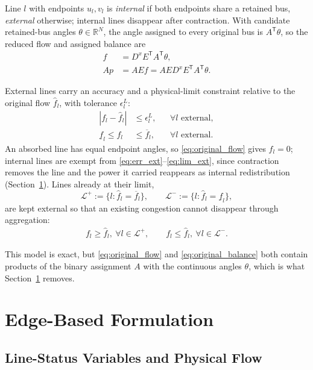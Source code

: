 \documentclass[journal]{IEEEtran}
\newcommand{\R}{\mathbb{R}}
\begin{document}
Line $l$ with endpoints $u_l,v_l$ is \emph{internal} if both endpoints share a retained bus, \emph{external} otherwise; internal lines disappear after contraction. With candidate retained-bus angles $\theta\in\R^N$, the angle assigned to every original bus is $A^{\mathsf T}\theta$, so the reduced flow and assigned balance are
\begin{align}
 f&=D^xE^{\mathsf T}A^{\mathsf T}\theta,
 \label{eq:original_flow}\\
 Ap&=AEf=AED^xE^{\mathsf T}A^{\mathsf T}\theta.
 \label{eq:original_balance}
\end{align}

External lines carry an accuracy and a physical-limit constraint relative to the original flow $\hat f_l$, with tolerance $\epsilon_l^L$:
\begin{align}
 |f_l-\hat f_l|&\le\epsilon_l^L,
 &&\forall l\text{ external},
 \label{eq:err_ext}\\
 \underline f_l\le f_l&\le\overline f_l,
 &&\forall l\text{ external}.
 \label{eq:lim_ext}
\end{align}
An absorbed line has equal endpoint angles, so \eqref{eq:original_flow} gives $f_l=0$; internal lines are exempt from \eqref{eq:err_ext}--\eqref{eq:lim_ext}, since contraction removes the line and the power it carried reappears as internal redistribution (Section~\ref{sec:edge}). Lines already at their limit,
\begin{equation}
 \mathcal L^+:=\{l:\hat f_l=\overline f_l\},\qquad
 \mathcal L^-:=\{l:\hat f_l=\underline f_l\},
\end{equation}
are kept external so that an existing congestion cannot disappear through aggregation:
\begin{align}
 f_l\ge\hat f_l,\ \forall l\in\mathcal L^+,\qquad
 f_l\le\hat f_l,\ \forall l\in\mathcal L^-.
 \label{eq:Lpm}
\end{align}

This model is exact, but \eqref{eq:original_flow} and \eqref{eq:original_balance} both contain products of the binary assignment $A$ with the continuous angles $\theta$, which is what Section~\ref{sec:edge} removes.

\section{Edge-Based Formulation}
\label{sec:edge}

\subsection{Line-Status Variables and Physical Flow}
\end{document}
